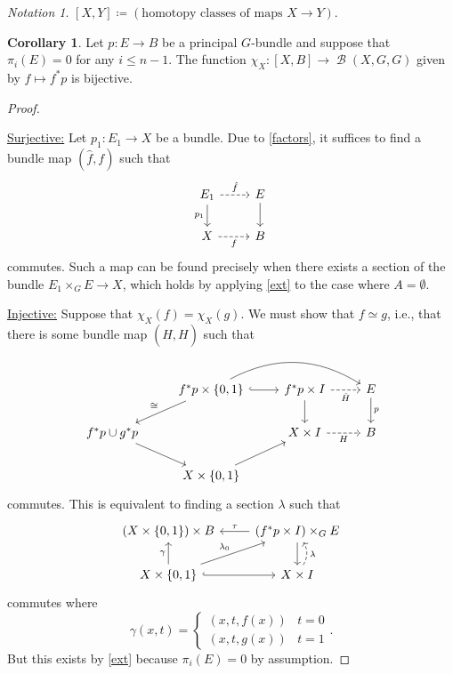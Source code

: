 \documentclass[10pt,letterpaper,cm]{nupset}
\theoremstyle{definition}
\theoremstyle{theorem}
\newtheorem{corollary}[defn]{Corollary}
\theoremstyle{remark}
\newtheorem*{notation}{Notation}
\newcommand{\1}{\mathbb{1}}
\newcommand{\0}{\vec 0}
\DeclareMathOperator{\B}{\mathcal{B}}
\begin{document}
\begin{notation}
$\left[X, Y\right] \coloneqq \left(\text{homotopy classes of maps } X \to Y\right)$.
\end{notation}

\begin{corollary}\label{classif}
Let $p: E \to B$ be a principal $G$-bundle and suppose that $\pi_i(E) =0$ for any $i\leq n-1$. The function $\chi_X : \left[X, B\right] \to \B\left(X, G, G \right)$ given by $f \mapsto f^{\ast}{p}$ is bijective. 
\end{corollary}
\begin{proof} $ $ 

\smallskip


\underline{Surjective:} Let $p_1 : E_1 \to X$ be a bundle. Due to \cref{factors}, it suffices to find a bundle map $\left(\hat{f}, f\right)$ such that
\[
\begin{tikzcd}
E_1 \arrow[d, "p_1"'] \arrow[r, "\hat{f}", dashed] & E \arrow[d] \\
X \arrow[r, "f"', dashed]                          & B          
\end{tikzcd}
\] commutes. Such a map can be found precisely when there exists a section of the bundle $E_1 \times_G E \to X$, which holds by applying \cref{ext} to the case where $A = \emptyset$.

\medskip

\underline{Injective:} Suppose that $\chi_X(f) = \chi_X(g)$. We must show that $f\simeq g$, i.e., that there is some bundle map $\left(\hat{H}, H\right)$ such that
\[
\begin{tikzcd}
                                       & {f^{\ast}{p}\times \{0,1\}} \arrow[r, hook] \arrow[rr, bend left] \arrow[ld, "\cong"'] & f^{\ast}{p}\times I \arrow[r, "\hat{H}"', dashed] \arrow[d] & E \arrow[d, "p"] \\
f^{\ast}{p}\cup g^{\ast}{p} \arrow[rd] &                                                                                        & X\times I \arrow[r, "H"', dashed]                           & B                \\
                                       & {X\times \{0,1\}} \arrow[ru]                                                           &                                                             &                 
\end{tikzcd}
\] commutes. This is equivalent to finding a section $\lambda$ such that
\[
\begin{tikzcd}
{\left(X\times \{0,1\}\right) \times B}                                       & \left(f^{\ast}{p} \times I\right)\times_G E \arrow[d] \arrow[l, "\tau"'] \\
{X\times \{0,1\}} \arrow[ru, "\lambda_0"] \arrow[r, hook] \arrow[u, "\gamma"] & X\times I \arrow[u, "\lambda"', dashed, bend right]                  
\end{tikzcd}
\] commutes where $$\gamma\left(x,t\right) = 
\begin{cases} \left(x,t, f(x)\right) & t= 0 \\ \left(x,t, g(x)\right) & t= 1 
\end{cases}.$$ But this exists by \cref{ext} because $\pi_i(E)=0$ by assumption.
\end{proof}
\end{document}
